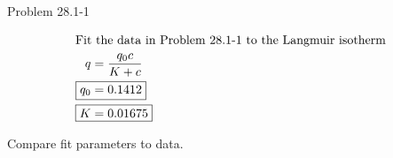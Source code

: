 \item Problem 28.1-1

\begin{align*}
    \intertext{Fit the data in Problem 28.1-1 to the Langmuir isotherm}
    q &= \frac{q_0c}{K + c} \\
    \Aboxed{q_0 &= 0.1412} \\
    \Aboxed{K &= 0.01675}
\end{align*}

Compare fit parameters to data.

\begin{center}
    
\end{center}
